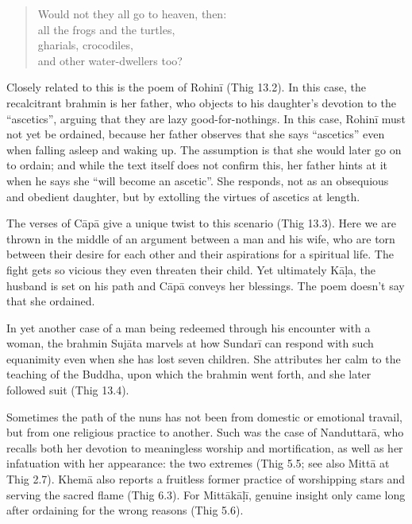 \documentclass[12pt,openany]{book}%
\begin{document}
\begin{quotation}%
Would not they all go to heaven, then:\\

all the frogs and the turtles,\\

gharials, crocodiles,\\

and other water-dwellers too?

%
\end{quotation}

Closely related to this is the poem of \textsanskrit{Rohinī} (Thig 13.2). In this case, the recalcitrant brahmin is her father, who objects to his daughter’s devotion to the “ascetics”, arguing that they are lazy good-for-nothings. In this case, \textsanskrit{Rohinī} must not yet be ordained, because her father observes that she says “ascetics” even when falling asleep and waking up. The assumption is that she would later go on to ordain; and while the text itself does not confirm this, her father hints at it when he says she “will become an ascetic”. She responds, not as an obsequious and obedient daughter, but by extolling the virtues of ascetics at length.

The verses of \textsanskrit{Cāpā} give a unique twist to this scenario (Thig 13.3). Here we are thrown in the middle of an argument between a man and his wife, who are torn between their desire for each other and their aspirations for a spiritual life. The fight gets so vicious they even threaten their child. Yet ultimately \textsanskrit{Kāḷa}, the husband is set on his path and \textsanskrit{Cāpā} conveys her blessings. The poem doesn’t say that she ordained.

In yet another case of a man being redeemed through his encounter with a woman, the brahmin \textsanskrit{Sujāta} marvels at how \textsanskrit{Sundarī} can respond with such equanimity even when she has lost seven children. She attributes her calm to the teaching of the Buddha, upon which the brahmin went forth, and she later followed suit (Thig 13.4).

Sometimes the path of the nuns has not been from domestic or emotional travail, but from one religious practice to another. Such was the case of \textsanskrit{Nanduttarā}, who recalls both her devotion to meaningless worship and mortification, as well as her infatuation with her appearance: the two extremes (Thig 5.5; see also \textsanskrit{Mittā} at Thig 2.7). \textsanskrit{Khemā} also reports a fruitless former practice of worshipping stars and serving the sacred flame (Thig 6.3). For \textsanskrit{Mittākāḷī}, genuine insight only came long after ordaining for the wrong reasons (Thig 5.6).
\end{document}
